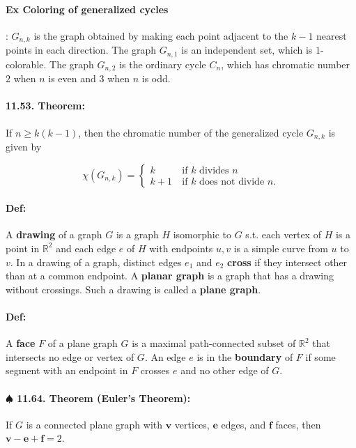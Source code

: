 \documentclass[a4paper, 11pt, twoside]{article}
\begin{document}
\paragraph{Ex Coloring of generalized cycles}: $G_{n,k}$ is the graph obtained by making each point adjacent to the $k-1$ nearest points in each direction. The graph $G_{n,1}$ is an independent set, which is $1$-colorable. The graph $G_{n,2}$ is the ordinary cycle $C_n$, which has chromatic number $2$ when $n$ is even and $3$ when $n$ is odd.

\paragraph{11.53. Theorem:} If $n\geq k(k-1)$, then the chromatic number of the generalized cycle $G_{n,k}$ is given by

\[\chi(G_{n,k})=\begin{cases}
	k\ & \text{if $k$ divides $n$}\\
	k+1\ &\text{if $k$ does not divide $n$.}
\end{cases}\]

\paragraph{Def:} A \textbf{drawing} of a graph $G$ is a graph $H$ isomorphic to $G$ s.t. each vertex of $H$ is a point in $\mathbb{R}^2$ and each edge $e$ of $H$ with endpoints $u,v$ is a simple curve from $u$ to $v$. In a drawing of a graph, distinct edges $e_1$ and $e_2$ \textbf{cross} if they intersect other than at a common endpoint. A \textbf{planar graph} is a graph that has a drawing without crossings. Such a drawing is called a \textbf{plane graph}.

\paragraph{Def:} A \textbf{face} $F$ of a plane graph $G$ is a maximal path-connected subset of $\mathbb{R}^2$ that intersects no edge or vertex of $G$. An edge $e$ is in the \textbf{boundary} of $F$ if some segment with an endpoint in $F$ crosses $e$ and no other edge of $G$.

\paragraph{$\spadesuit$ 11.64. Theorem (Euler's Theorem):} If $G$ is a connected plane graph with $\textbf{v}$ vertices, $\textbf{e}$ edges, and $\textbf{f}$ faces, then $\textbf{v}-\textbf{e}+\textbf{f}=2$.
\end{document}
